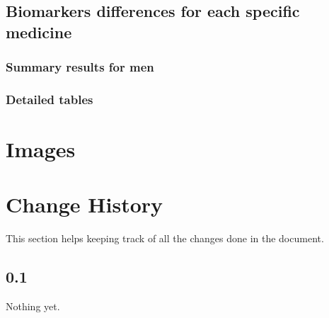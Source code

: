 \documentclass[10pt, a4paper, onecolumn]{article} %
\begin{document}
\subsection{Biomarkers differences for each specific medicine}

\subsubsection{Summary results for men}



\subsubsection{Detailed tables}












\newpage


\section{Images}

\newpage

\section{Change History}

This section helps keeping track of all the changes done in the document.\\

\subsection*{0.1}

Nothing yet.\\
\end{document}
